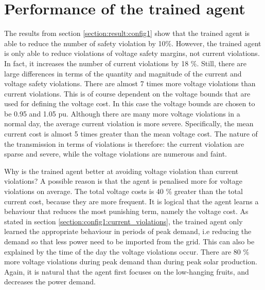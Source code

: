 \documentclass[class=book, crop=false]{standalone}
\begin{document}
\section{Performance of the trained agent}
The results from section \ref{section:result:config1} show that the trained agent is able to reduce the number of safety violation by 10\%. However, the trained agent is only able to reduce violations of voltage safety margins, not current violations. In fact, it increases the number of current violations by 18 \%. Still, there are large differences in terms of the quantity and magnitude of the current and voltage safety violations. There are almost 7 times more voltage violations than current violations. This is of course dependent on the voltage bounds that are used for defining the voltage cost. In this case the voltage bounds are chosen to be 0.95 and 1.05 pu. Although there are many more voltage violations in a normal day, the average current violation is more severe. Specifically, the mean current cost is almost 5 times greater than the mean voltage cost. The nature of the transmission in terms of violations is therefore: the current violation are sparse and severe, while the voltage violations are numerous and faint. 

Why is the trained agent better at avoiding voltage violation than current violations? A possible reason is that the agent is penalised more for voltage violations on average. The total voltage costs is 40 \% greater than the total current cost, because they are more frequent. It is logical that the agent learns a behaviour that reduces the most punishing term, namely the voltage cost. As stated in section \ref{section:config1:current_violations}, the trained agent only learned the appropriate behaviour in periods of peak demand, i.e reducing the demand so that less power need to be imported from the grid. This can also be explained by the time of the day the voltage violations occur. There are 80 \% more voltage violations during peak demand than during peak solar production. Again, it is natural that the agent first focuses on the low-hanging fruits, and decreases the power demand.   
\end{document}
